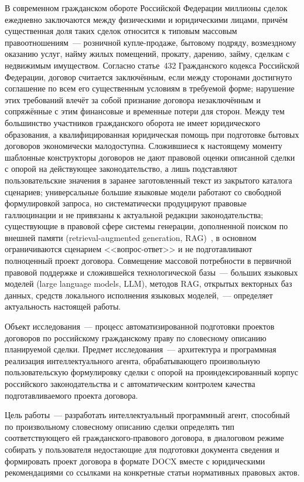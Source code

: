 \introduction %

В современном гражданском обороте Российской Федерации миллионы сделок ежедневно заключаются между физическими и юридическими лицами, причём существенная доля таких сделок относится к типовым массовым правоотношениям~--- розничной купле-продаже, бытовому подряду, возмездному оказанию услуг, найму жилых помещений, прокату, дарению, займу, сделкам с недвижимым имуществом. Согласно статье~432 Гражданского кодекса Российской Федерации, договор считается заключённым, если между сторонами достигнуто соглашение по всем его существенным условиям в требуемой форме; нарушение этих требований влечёт за собой признание договора незаключённым и сопряжённые с этим финансовые и временные потери для сторон. Между тем большинство участников гражданского оборота не имеет юридического образования, а квалифицированная юридическая помощь при подготовке бытовых договоров экономически малодоступна. Сложившиеся к настоящему моменту шаблонные конструкторы договоров не дают правовой оценки описанной сделки с опорой на действующее законодательство, а лишь подставляют пользовательские значения в заранее заготовленный текст из закрытого каталога сценариев; универсальные большие языковые модели работают со свободной формулировкой запроса, но систематически продуцируют правовые галлюцинации и не привязаны к актуальной редакции законодательства; существующие в правовой сфере системы генерации, дополненной поиском по внешней памяти (retrieval-augmented generation, RAG)~\cite{lewis2020rag}, в основном ограничиваются сценарием <<вопрос-ответ>> и не подготавливают полноценный проект договора. Совмещение массовой потребности в первичной правовой поддержке и сложившейся технологической базы~--- больших языковых моделей (large language models, LLM), методов RAG, открытых векторных баз данных, средств локального исполнения языковых моделей,~--- определяет актуальность настоящей работы.

Объект исследования~--- процесс автоматизированной подготовки проектов договоров по российскому гражданскому праву по словесному описанию планируемой сделки. Предмет исследования~--- архитектура и программная реализация интеллектуального агента, обрабатывающего произвольную пользовательскую формулировку сделки с опорой на проиндексированный корпус российского законодательства и с автоматическим контролем качества подготавливаемого проекта договора.

Цель работы~--- разработать интеллектуальный программный агент, способный по произвольному словесному описанию сделки определять тип соответствующего ей гражданского-правового договора, в диалоговом режиме собирать у пользователя недостающие для подготовки документа сведения и формировать проект договора в формате DOCX вместе с юридическими рекомендациями со ссылками на конкретные статьи нормативных правовых актов.

